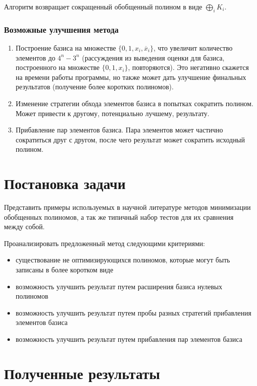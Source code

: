 \documentclass[a4paper,12pt,titlepage,finall]{article}
\begin{document}
Алгоритм возвращает сокращенный обобщенный полином в виде $ \bigoplus\limits_i K_i $.

\subsubsection{Возможные улучшения метода}

\begin{enumerate}
    \item Построение базиса на множестве $ \{ 0, 1, x_i, \overline x_i \} $, что увеличит количество элементов до $ 4^n - 3^n $ (рассуждения из выведения оценки для базиса, построенного на множестве $ \{ 0, 1, x_i \} $, повторяются). Это негативно скажется на времени работы программы, но также может дать улучшение финальных результатов (получение более коротких полиномов).
    \item Изменение стратегии обхода элементов базиса в попытках сократить полином. Может привести к другому, потенциально лучшему, результату.
    \item Прибавление пар элементов базиса. Пара элементов может частично сократиться друг с другом, после чего результат может сократить исходный полином.
\end{enumerate}

\section{Постановка задачи}

Представить примеры используемых в научной литературе методов минимизации обобщенных полиномов, а так же типичный набор тестов для их сравнения между собой.

Проанализировать предложенный метод следующими критериями:
\begin{itemize}
    \item существование не оптимизирующихся полиномов, которые могут быть записаны в более коротком виде
    \item возможность улучшить результат путем расширения базиса нулевых полиномов
    \item возможность улучшить результат путем пробы разных стратегий прибавления элементов базиса
    \item возможность улучшить результат путем прибавления пар элементов базиса
\end{itemize}

\section{Полученные результаты}
\end{document}
